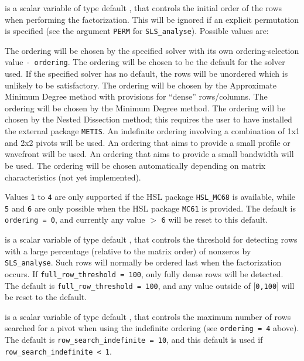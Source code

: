 \documentclass{galahad}
\newcommand{\packagename}{SLS}
\begin{document}
\begin{description}
 is a scalar variable of type default \integer, that
controls the initial order of the rows when performing the factorization.
This will be ignored if an explicit permutation is specified (see the
argument {\tt PERM} for {\tt \packagename\_analyse}).
Possible values are:
\begin{description}
 The ordering will be chosen by the specified solver with its
        own ordering-selection value {\tt - ordering}.
 The ordering will be chosen to be the default for the solver used.
        If the specified solver has no default, the rows will be unordered
        which is unlikely to be satisfactory.
 The ordering will be chosen by the Approximate Minimum Degree method
       with provisions for ``dense'' rows/columns.
 The ordering will be chosen by the Minimum Degree method.
 The ordering will be chosen by the Nested Dissection method; this
 requires the user to have installed the external package {\tt METIS}.
 An indefinite ordering involving a combination of 1x1 and 2x2 pivots
       will be used.
 An ordering that aims to provide a small profile or wavefront
       will be used.
 An ordering that aims to provide a small bandwidth will be used.
 The ordering will be chosen automatically depending on matrix
       characteristics (not yet implemented).
\end{description}
Values {\tt 1} to {\tt 4} are only supported if the HSL package {\tt HSL\_MC68}
is available, while {\tt 5} and {\tt 6} are only possible
when the HSL package {\tt MC61} is provided.
The default is {\tt ordering = 0}, and currently any value $>$ {\tt 6} will
be reset to this default.

 is a scalar variable of type default \integer,
that controls the threshold for detecting rows with a large percentage
(relative to the matrix order) of nonzeros by {\tt \packagename\_analyse}.
Such rows will normally be ordered last when the factorization occurs.
If {\tt full\_row\_threshold = 100}, only fully dense
rows will be detected.
The default is {\tt full\_row\_threshold = 100},
and any value outside of $[${\tt 0,100}$]$ will be reset to the default.

 is a scalar variable of type default \integer,
that controls the maximum number of rows searched for a pivot when using the
indefinite ordering (see {\tt ordering = 4} above).
The default is {\tt row\_search\_\-indefinite = 10},
and this default is used if {\tt row\_search\_\-indefinite < 1}.


\end{description}
\end{document}
